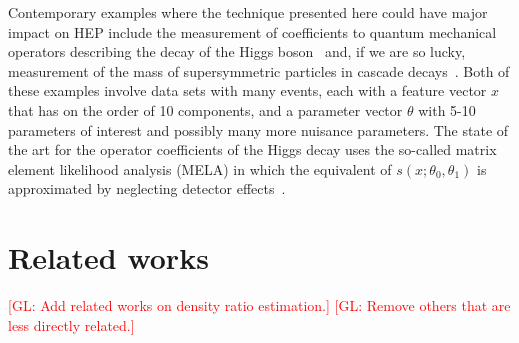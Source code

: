 \documentclass[12pt]{article}
\numberwithin{equation}{section}
\theoremstyle{plain}
\newcommand{\glnote}[1]{\textcolor{red}{[GL: #1]}}
\begin{document}
Contemporary examples where the technique presented here could have major impact
on HEP include the measurement of coefficients to quantum mechanical operators
describing the decay of the Higgs boson~\citep{Chen:2014pia} and, if we are so
lucky, measurement of the mass of supersymmetric particles in cascade
decays~\citep{Allanach:2000kt}.  Both of these examples involve data sets with
many events, each with a feature vector $x$ that has on the order of 10
components, and a parameter vector $\theta$ with 5-10 parameters of interest and
possibly many more nuisance parameters. The state of the art for the operator
coefficients of the Higgs decay uses the so-called matrix element likelihood
analysis (MELA) in which the equivalent of $s(x; \theta_0, \theta_1)$ is
approximated by neglecting detector effects~\citep{Gao:2010qx,Bolognesi:2012mm}.



\section{Related works}
\label{sec:related}

\glnote{Add related works on density ratio estimation.}
\glnote{Remove others that are less directly related.}
\end{document}
